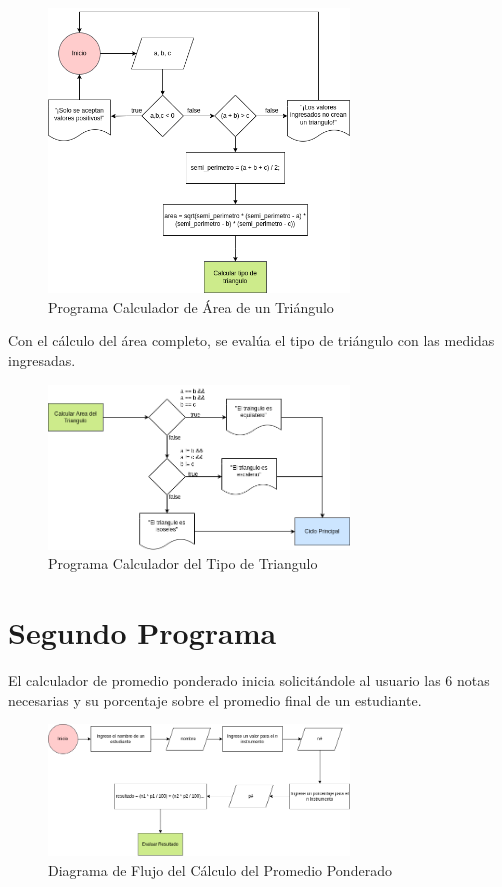 \documentclass{article}
\begin{document}
\begin{figure}[h]
    \centering
    \includegraphics[width=8cm]{triangulo_area}
    \caption{Programa Calculador de Área de un Triángulo}
\end{figure}

Con el cálculo del área completo, se evalúa el tipo de triángulo con las medidas ingresadas.

\begin{figure}[h]
    \centering
    \includegraphics[width=8cm]{triangulo_tipo}
    \caption{Programa Calculador del Tipo de Triangulo}
\end{figure}

\section{Segundo Programa}

El calculador de promedio ponderado inicia solicitándole al usuario las 6 notas necesarias y su porcentaje sobre el promedio final de un estudiante.

\begin{figure}[H]
    \centering
    \includegraphics[width=8cm]{promedio_ponderado_calcular_resultado}
    \caption{Diagrama de Flujo del Cálculo del Promedio Ponderado}
\end{figure}
\end{document}
